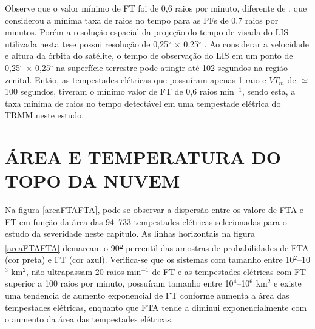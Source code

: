 Observe que o valor mínimo de FT foi de 0,6 raios por minuto, diferente de , que considerou a mínima taxa de raios no tempo para as PFs de 0,7 raios por minutos. Porém a resolução espacial da projeção do tempo de visada do LIS utilizada nesta tese possui resolução de 0,25$^{\circ}$ $\times$ 0,25$^{\circ}$  \cite{albrecht2009tropical,albrecht2011b}. Ao considerar a velocidade e altura da órbita do satélite, o tempo de observação do LIS em um ponto de 0,25$^{\circ}$ $\times$ 0,25$^{\circ}$ na superfície terrestre pode atingir até 102 segundos na região zenital. Então, as tempestades elétricas que possuíram apenas 1 raio e $VT_m$ de $\simeq$100 segundos, tiveram o mínimo valor de FT de 0,6 raios min$^{-1}$, sendo esta, a taxa mínima de raios no tempo detectável em uma tempestade elétrica do TRMM neste estudo.



\section{ÁREA E TEMPERATURA DO TOPO DA NUVEM}




Na figura \ref{areaFTAFTA}, pode-se observar a dispersão entre os valore de FTA e FT em função da área das 94~733 tempestades elétricas selecionadas para o estudo da severidade neste capítulo. As linhas horizontais na figura \ref{areaFTAFTA} demarcam o 90\textsuperscript{\underline{o}} percentil das amostras de probabilidades de FTA (cor preta) e FT (cor azul). Verifica-se que os sistemas com tamanho entre 10$^2$--10$^3$ km$^2$, não ultrapassam 20 raios min$^{-1}$ de FT e as tempestades elétricas com FT superior a 100 raios por minuto, possuíram tamanho entre 10$^{4}$--10$^{6}$ km$^2$ e existe uma tendencia de aumento exponencial de FT conforme aumenta a área das tempestades elétricas, enquanto que FTA tende a diminui exponencialmente com o aumento da área das tempestades elétricas.

